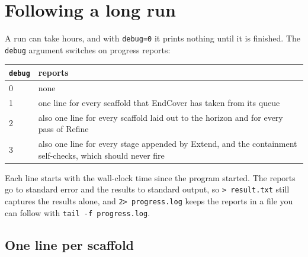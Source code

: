 \documentclass[11pt,a4paper]{article}
\begin{document}
\section{Following a long run}\label{sec:debug}

A run can take hours, and with \texttt{debug=0} it prints nothing until it
is finished. The \texttt{debug} argument switches on progress reports:

\begin{center}\small
\begin{tabular}{lp{}}
\toprule
\texttt{debug} & reports \\
\midrule
0 & none \\
1 & one line for every scaffold that EndCover has taken from its queue \\
2 & also one line for every scaffold laid out to the horizon and for every
    pass of Refine \\
3 & also one line for every stage appended by Extend, and the containment
    self-checks, which should never fire \\
\bottomrule
\end{tabular}
\end{center}

Each line starts with the wall-clock time since the program started. The
reports go to standard error and the results to standard output, so
\verb|> result.txt| still captures the results alone, and
\verb|2> progress.log| keeps the reports in a file you can follow with
\verb|tail -f progress.log|.

\subsection{One line per scaffold}
\end{document}
